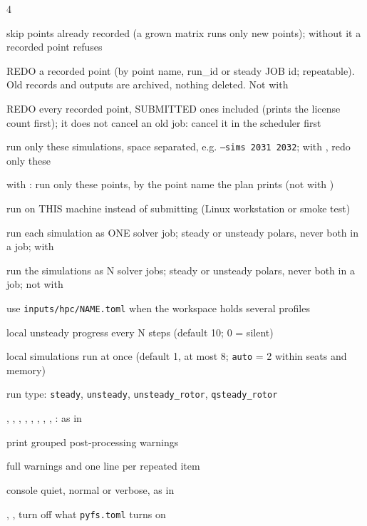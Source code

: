 \begin{multicols}{4}
\begin{flags}
\item {} skip points already recorded (a grown matrix runs only new points); without it a recorded point refuses
\item {} REDO a recorded point (by point name, run\_id or steady JOB id; repeatable). Old records and outputs are archived, nothing deleted. Not with 
\item {} REDO every recorded point, SUBMITTED ones included (prints the license count first); it does not cancel an old job: cancel it in the scheduler first
\item {} run only these simulations, space separated, e.g. \texttt{--sims 2031 2032}; with , redo only these
\item {} with : run only these points, by the point name the plan prints (not with )
\item {} run on THIS machine instead of submitting (Linux workstation or smoke test)
\item {} run each simulation as ONE solver job; steady or unsteady polars, never both in a job; with 
\item {} run the simulations as N solver jobs; steady or unsteady polars, never both in a job; not with 
\item {} use \texttt{inputs/hpc/NAME.toml} when the workspace holds several profiles
\item {} local unsteady progress every N steps (default 10; 0 = silent)
\item {} local simulations run at once (default 1, at most 8; \texttt{auto} = 2 within seats and memory)
\item {} run type: \texttt{steady}, \texttt{unsteady}, \texttt{unsteady\_rotor}, \texttt{qsteady\_rotor}
\item {}, , , , , , , , : as in 
\item {} print grouped post-processing warnings
\item {} full warnings and one line per repeated item
\item {} console quiet, normal or verbose, as in 
\item {}, ,  turn off what \texttt{pyfs.toml} turns on
\end{flags}


\end{multicols}

